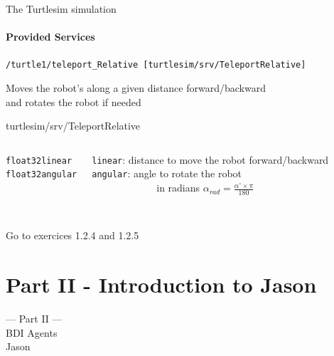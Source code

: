 \documentclass[compress]{beamer}
\begin{document}
\begin{frame}{The Turtlesim simulation}
\framesubtitle{{\bf Provided Services}}
\footnotesize
 \texttt{/turtle1/teleport\_Relative [turtlesim/srv/TeleportRelative]}\\ \vspace{.5cm}
 
 Moves the robot's along a given distance forward/backward \\
 {\tiny and rotates the robot if needed}
 
 
 \vspace{.5cm}
 \begin{block}{{\tiny turtlesim/srv/TeleportRelative}}
 \begin{columns}
   
    
       \tiny
         \begin{alltt}
            float32 linear\\
            float32 angular\\
            \ \\
            \ \\
        \end{alltt}
     \tiny
     \texttt{linear}: distance to move the robot forward/backward\\ \vspace{.1cm}
     \texttt{angular}: angle to rotate the robot\\ 
     {\tiny \ \ \ \ \ \ \ \ \ \ \ \ \ in radians }
     {\tiny $\alpha_{rad}=\frac{\alpha^{\circ}\times \pi}{180}$}
 \end{columns}
 \end{block}
 
 \vfill 
 
{\tiny Go to exercices 1.2.4 and 1.2.5}
 
\end{frame}


\section{Part II - Introduction to Jason}



\begin{frame}
 

 \HUGE
\centering
--- Part II ---\\
BDI Agents\\
Jason
 
\end{frame}
\end{document}
